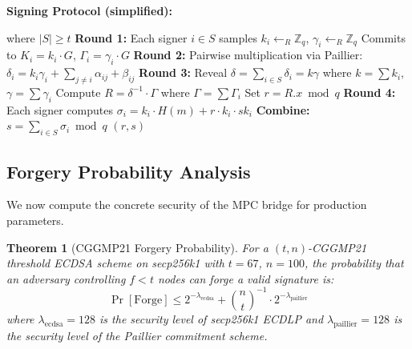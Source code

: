 \documentclass[11pt]{article}
\newtheorem{theorem}{Theorem}
\begin{document}
\textbf{Signing Protocol (simplified):}
\begin{algorithm}[H]
\caption{CGGMP21 Threshold ECDSA Signing}
\begin{algorithmic}[1]
 where $|S| \geq t$
    \State \textbf{Round 1:} Each signer $i \in S$ samples $k_i \gets_R \mathbb{Z}_q$, $\gamma_i \gets_R \mathbb{Z}_q$
    \State \quad Commits to $K_i = k_i \cdot G$, $\Gamma_i = \gamma_i \cdot G$
    \State \textbf{Round 2:} Pairwise multiplication via Paillier: $\delta_i = k_i \gamma_i + \sum_{j \neq i} \alpha_{ij} + \beta_{ij}$
    \State \textbf{Round 3:} Reveal $\delta = \sum_{i \in S} \delta_i = k \gamma$ where $k = \sum k_i$, $\gamma = \sum \gamma_i$
    \State \quad Compute $R = \delta^{-1} \cdot \Gamma$ where $\Gamma = \sum \Gamma_i$
    \State \quad Set $r = R.x \bmod q$
    \State \textbf{Round 4:} Each signer computes $\sigma_i = k_i \cdot H(m) + r \cdot k_i \cdot sk_i$
    \State \textbf{Combine:} $s = \sum_{i \in S} \sigma_i \bmod q$
    \State \Return $(r, s)$
\EndFunction
\end{algorithmic}
\end{algorithm}

\subsection{Forgery Probability Analysis}

We now compute the concrete security of the MPC bridge for production parameters.

\begin{theorem}[CGGMP21 Forgery Probability]\label{thm:cggmp21-security}
For a $(t, n)$-CGGMP21 threshold ECDSA scheme on \textup{secp256k1} with $t = 67$, $n = 100$, the probability that an adversary controlling $f < t$ nodes can forge a valid signature is:
\begin{equation}
\Pr[\text{Forge}] \leq 2^{-\lambda_{\text{ecdsa}}} + \binom{n}{t}^{-1} \cdot 2^{-\lambda_{\text{paillier}}}
\end{equation}
where $\lambda_{\text{ecdsa}} = 128$ is the security level of secp256k1 ECDLP and $\lambda_{\text{paillier}} = 128$ is the security level of the Paillier commitment scheme.
\end{theorem}
\end{document}
